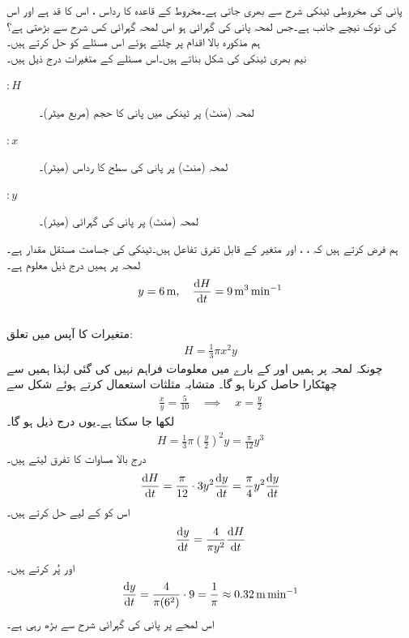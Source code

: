 پانی کی مخروطی ٹینکی   شرح سے بھری جاتی ہے۔مخروط کے قاعدہ کا رداس ، اس کا قد  ہے  اور اس کی نوک نیچے جانب ہے۔جس لمحہ پانی کی گہرائی  ہو اس لمحہ گہرائی کس شرح سے بڑھتی ہے؟\\
ہم مذکورہ بالا اقدام پر چلتے ہوئے اس مسئلے کو حل کرتے ہیں۔\\
\quad
{} نیم بھری ٹینکی کی شکل بناتے ہیں۔اس مسئلے کے متغیرات درج ذیل ہیں۔
\begin{description}
\item[$:H$]
لمحہ  (منٹ) پر ٹینکی میں پانی کا حجم (مربع میٹر)۔
\item[$:x$]
لمحہ  (منٹ) پر پانی کی سطح کا رداس (میٹر)۔
\item[$:y$]
لمحہ  (منٹ) پر پانی کی گہرائی (میٹر)۔
\end{description}
ہم فرض کرتے ہیں کہ ، ،  اور  متغیر  کے قابل تفرق تفاعل ہیں۔ٹینکی کی جسامت مستقل مقدار ہے۔\\
\quad
{} لمحہ  پر ہمیں درج ذیل معلوم ہے۔
\begin{align*}
y=\SI{6}{\meter},\quad \frac{\dif H}{\dif t}=\SI{9}{\meter\cubed\per\minute}
\end{align*}
\quad
{}  \\
\quad
متغیرات کا آپس میں تعلق:
\begin{align*}
H=\frac{1}{3}\pi x^2 y
\end{align*}
چونکہ لمحہ  پر ہمیں  اور  کے بارے میں معلومات فراہم نہیں کی گئی لہٰذا ہمیں  سے چھٹکارا حاصل کرنا ہو گا۔ متشابہ مثلثات استعمال کرتے ہوئے شکل سے
\begin{align*}
\frac{x}{y}=\frac{5}{10}\quad \implies \quad x=\frac{y}{2}
\end{align*}
لکھا جا سکتا ہے۔یوں درج ذیل ہو گا۔
\begin{align*}
H=\frac{1}{3}\pi (\tfrac{y}{2})^2y=\frac{\pi}{12}y^3
\end{align*}
\quad
{}  درج بالا مساوات کا تفرق لیتے ہیں۔
\begin{align*}
\frac{\dif H}{\dif t}=\frac{\pi}{12} \cdot 3y^2\frac{\dif y}{\dif t}=\frac{\pi}{4}y^2\frac{\dif y}{\dif t}
\end{align*}
اس کو  کے لیے حل کرتے ہیں۔
\begin{align*}
\frac{\dif y}{\dif t}=\frac{4}{\pi y^2}\frac{\dif H}{\dif t}
\end{align*}
\quad
{}   اور  پُر کرتے ہیں۔
\begin{align*}
\frac{\dif y}{\dif t}=\frac{4}{\pi (6^2)}\cdot 9=\frac{1}{\pi}\approx \SI{0.32}{\meter\per\minute}
\end{align*}
اس لمحے پر پانی کی گہرائی   شرح  سے بڑھ رہی ہے۔

